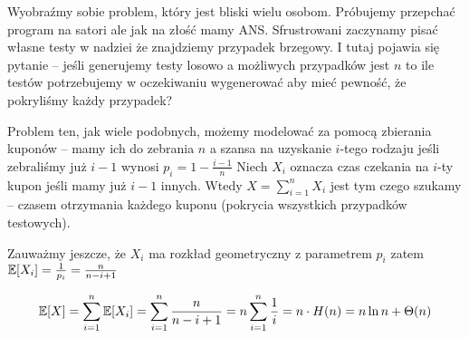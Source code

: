 Wyobraźmy sobie problem, który jest bliski wielu osobom. Próbujemy przepchać program na satori ale jak na złość mamy ANS. Sfrustrowani zaczynamy pisać własne testy w nadziei że znajdziemy przypadek brzegowy.
I tutaj pojawia się pytanie -- jeśli generujemy testy losowo a możliwych przypadków jest \( n \) to ile testów potrzebujemy w oczekiwaniu wygenerować aby mieć pewność, że pokryliśmy każdy przypadek?

Problem ten, jak wiele podobnych, możemy modelować za pomocą zbierania kuponów -- mamy ich do zebrania \( n \)
a szansa na uzyskanie \(i\)-tego rodzaju jeśli zebraliśmy już \( i - 1 \) wynosi \( p_i = 1 - \frac{i-1}{n} \)
Niech \( X_i \) oznacza czas czekania na \(i\)-ty kupon jeśli mamy już \(i-1\) innych.
Wtedy \(X = \sum_{i=1}^n X_i\) jest tym czego szukamy -- czasem otrzymania każdego kuponu (pokrycia wszystkich przypadków testowych).

Zauważmy jeszcze, że \( X_i \) ma rozkład geometryczny z parametrem \( p_i \) zatem \( \expected{X_i} = \frac{1}{p_i} = \frac{n}{n - i + 1} \)

\[
	\expected{X} = \sum_{i=1}^n \expected{X_i} = \sum_{i=1}^n \frac{n}{n-i+1} = n \sum_{i=1}^n \frac{1}{i}
	= n \cdot H(n) = n \ln n + \Theta(n)
\]
